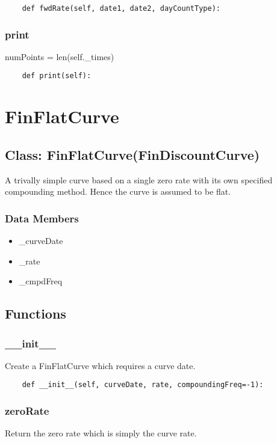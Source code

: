 \documentclass[twoside,11pt]{book}
\begin{document}
\begin{lstlisting}
    def fwdRate(self, date1, date2, dayCountType):
\end{lstlisting}

\subsubsection*{{\bf print}}
numPoints = len(self.\_times) 

\begin{lstlisting}
    def print(self):
\end{lstlisting}

\newpage
\section{FinFlatCurve}

\subsection*{Class: FinFlatCurve(FinDiscountCurve)}
A trivally simple curve based on a single zero rate with its own specified compounding method. Hence the curve is assumed to be flat.  

\subsubsection*{Data Members}
\begin{itemize}
\item{\_curveDate}
\item{\_rate}
\item{\_cmpdFreq}
\end{itemize}

\subsection*{Functions}

\subsubsection*{{\bf \_\_init\_\_}}
Create a FinFlatCurve which requires a curve date.  

\begin{lstlisting}
    def __init__(self, curveDate, rate, compoundingFreq=-1):
\end{lstlisting}

\subsubsection*{{\bf zeroRate}}
Return the zero rate which is simply the curve rate.  
\end{document}
